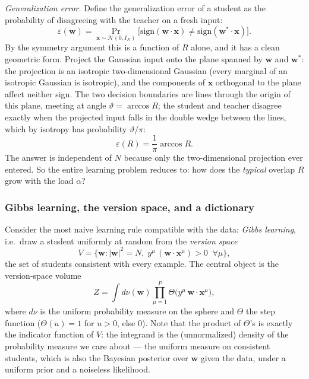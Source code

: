 \documentclass[11pt]{article}
\newcommand{\bv}[1]{\boldsymbol{#1}}
\begin{document}
\emph{Generalization error.} Define the generalization error of a student
as the probability of disagreeing with the teacher on a fresh input:
\begin{equation}
  \label{eq:gen-error-def}
  \varepsilon(\bv{w}) = \Pr_{\bv{x}\sim\mathcal{N}(0,I_N)}
  \bigl[\mathrm{sign}(\bv{w}\cdot\bv{x}) \neq
  \mathrm{sign}(\bv{w}^*\cdot\bv{x})\bigr].
\end{equation}
By the symmetry argument this is a function of $R$ alone, and it has a
clean geometric form. Project the Gaussian input onto the plane spanned by
$\bv{w}$ and $\bv{w}^*$: the projection is an isotropic two-dimensional
Gaussian (every marginal of an isotropic Gaussian is isotropic), and the
components of $\bv{x}$ orthogonal to the plane affect neither sign. The two
decision boundaries are lines through the origin of this plane, meeting at
angle $\vartheta = \arccos R$; the student and teacher disagree exactly
when the projected input falls in the double wedge between the lines, which
by isotropy has probability $\vartheta/\pi$:
\begin{equation}
  \label{eq:eps-of-R}
  \varepsilon(R) = \frac{1}{\pi}\arccos R .
\end{equation}
The answer is independent of $N$ because only the two-dimensional
projection ever entered. So the entire learning problem reduces to: how
does the \emph{typical} overlap $R$ grow with the load $\alpha$?

\subsubsection{Gibbs learning, the version space, and a dictionary}
\label{sec:dictionary}

Consider the most naive learning rule compatible with the data:
\emph{Gibbs learning}, i.e.\ draw a student uniformly at random from the
\emph{version space}
\begin{equation}
  \label{eq:version-space}
  V = \bigl\{\bv{w} : |\bv{w}|^2 = N,\;
  y^\mu\,(\bv{w}\cdot\bv{x}^\mu) > 0 \;\; \forall \mu \bigr\},
\end{equation}
the set of students consistent with every example. The central object is
the version-space volume
\begin{equation}
  \label{eq:Z-def}
  Z = \int d\nu(\bv{w}) \prod_{\mu=1}^{P}
  \Theta\bigl(y^\mu\, \bv{w}\cdot\bv{x}^\mu\bigr),
\end{equation}
where $d\nu$ is the uniform probability measure on the sphere and $\Theta$
the step function ($\Theta(u) = 1$ for $u > 0$, else $0$). Note that the
product of $\Theta$'s is exactly the indicator function of $V$: the
integrand is the (unnormalized) density of the probability measure we care
about --- the uniform measure on consistent students, which is also the
Bayesian posterior over $\bv{w}$ given the data, under a uniform prior and
a noiseless likelihood.
\end{document}
